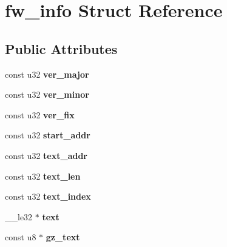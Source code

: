 \hypertarget{structfw__info}{
\section{fw\_\-info Struct Reference}
\label{structfw__info}
}
\subsection*{Public Attributes}
\begin{DoxyCompactItemize}
\item 
\hypertarget{structfw__info_a201491cf782011ebaa2e6c1d6d5f57af}{
const u32 {\bfseries ver\_\-major}}
\label{structfw__info_a201491cf782011ebaa2e6c1d6d5f57af}

\item 
\hypertarget{structfw__info_a1cf8739fe9ac861e3e749842f9f0e12d}{
const u32 {\bfseries ver\_\-minor}}
\label{structfw__info_a1cf8739fe9ac861e3e749842f9f0e12d}

\item 
\hypertarget{structfw__info_a766d25cc1dea40560ed3cedd3f6160fc}{
const u32 {\bfseries ver\_\-fix}}
\label{structfw__info_a766d25cc1dea40560ed3cedd3f6160fc}

\item 
\hypertarget{structfw__info_a010186b4c610dd120de474d7a3d30dba}{
const u32 {\bfseries start\_\-addr}}
\label{structfw__info_a010186b4c610dd120de474d7a3d30dba}

\item 
\hypertarget{structfw__info_a1a512516eef76a32846d34dde0d5b74b}{
const u32 {\bfseries text\_\-addr}}
\label{structfw__info_a1a512516eef76a32846d34dde0d5b74b}

\item 
\hypertarget{structfw__info_a23ec6af5b58b5621a881db0cab2ac51a}{
const u32 {\bfseries text\_\-len}}
\label{structfw__info_a23ec6af5b58b5621a881db0cab2ac51a}

\item 
\hypertarget{structfw__info_a9242ecd8a4cae6033dce0dc339ff2345}{
const u32 {\bfseries text\_\-index}}
\label{structfw__info_a9242ecd8a4cae6033dce0dc339ff2345}

\item 
\hypertarget{structfw__info_a1d9264c9492a638387f9e0d0f995a250}{
\_\-\_\-le32 $\ast$ {\bfseries text}}
\label{structfw__info_a1d9264c9492a638387f9e0d0f995a250}

\item 
\hypertarget{structfw__info_a794a411df0cf240f053a2baa7dfa62b0}{
const u8 $\ast$ {\bfseries gz\_\-text}}
\label{structfw__info_a794a411df0cf240f053a2baa7dfa62b0}


\end{DoxyCompactItemize}
